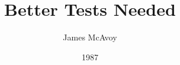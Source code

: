 \documentclass[10pt,a4paper]{article}
\begin{document}
\title{Better Tests Needed}
\date{1987}
\author{James McAvoy}
\maketitle
    
\thispagestyle{plain}
\setcounter{page}{1}
\linenumbers
\end{document}

